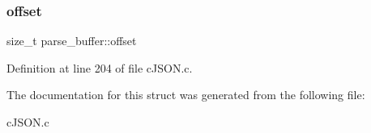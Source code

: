 \mbox{\label{structparse__buffer_af727920073077579942a79de519bb31a}} 
\subsubsection{\texorpdfstring{offset}{offset}}
{\footnotesize\ttfamily size\+\_\+t parse\+\_\+buffer\+::offset}



Definition at line 204 of file c\+J\+S\+O\+N.\+c.



The documentation for this struct was generated from the following file\+:\begin{DoxyCompactItemize}
\item 
c\+J\+S\+O\+N.\+c\end{DoxyCompactItemize}
